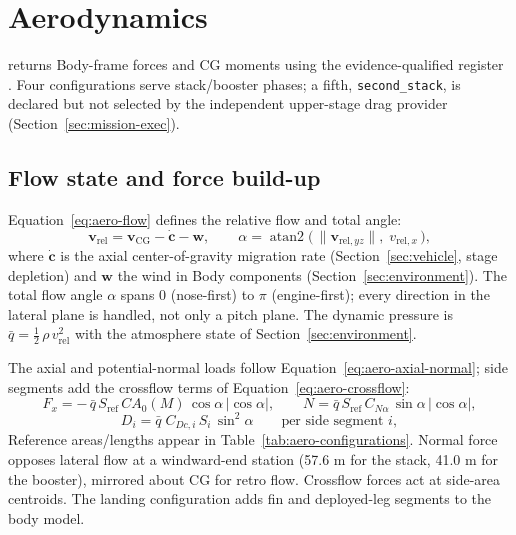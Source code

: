 \section{Aerodynamics}
\label{sec:aero}

 returns Body-frame forces and CG moments using the evidence-qualified register . Four configurations serve stack/booster phases; a fifth, \texttt{second\_stack}, is declared but not selected by the independent upper-stage drag provider (Section~\ref{sec:mission-exec}).

\subsection{Flow state and force build-up}

Equation~\eqref{eq:aero-flow} defines the relative flow and total angle:
%
\begin{equation}
\label{eq:aero-flow}
\mathbf{v}_{\mathrm{rel}} = \mathbf{v}_{\mathrm{CG}}
- \dot{\mathbf{c}} - \mathbf{w},
\qquad
\alpha = \operatorname{atan2}\bigl(\, \lVert \mathbf{v}_{\mathrm{rel},yz}\rVert, \; v_{\mathrm{rel},x} \,\bigr),
\end{equation}
%
where $\dot{\mathbf{c}}$ is the axial center-of-gravity migration rate
(Section~\ref{sec:vehicle}, stage depletion) and $\mathbf{w}$ the wind in
Body components (Section~\ref{sec:environment}). The total flow angle
$\alpha$ spans $0$ (nose-first) to $\pi$ (engine-first); every direction in
the lateral plane is handled, not only a pitch plane. The dynamic pressure
is $\bar{q} = \tfrac{1}{2}\,\rho\,v_{\mathrm{rel}}^2$ with the atmosphere
state of Section~\ref{sec:environment}.

The axial and potential-normal loads follow Equation~\eqref{eq:aero-axial-normal}; side segments add the crossflow terms of Equation~\eqref{eq:aero-crossflow}:
%
\begin{equation}
\label{eq:aero-axial-normal}
F_x = -\,\bar{q}\, S_{\mathrm{ref}}\, CA_0(M)\,\cos\alpha
\,|\!\cos\alpha|,
\qquad
N = \bar{q}\, S_{\mathrm{ref}}\, C_{N\alpha}\, \sin\alpha
\,|\!\cos\alpha|,
\end{equation}
%
\begin{equation}
\label{eq:aero-crossflow}
D_i = \bar{q}\; C_{Dc,i}\, S_i \,\sin^2\alpha
\qquad \text{per side segment } i,
\end{equation}
%
Reference areas/lengths appear in Table~\ref{tab:aero-configurations}. Normal force opposes lateral flow at a windward-end station (57.6 m for the stack, 41.0 m for the booster), mirrored about CG for retro flow. Crossflow forces act at side-area centroids. The landing configuration adds fin and deployed-leg segments to the body model.

